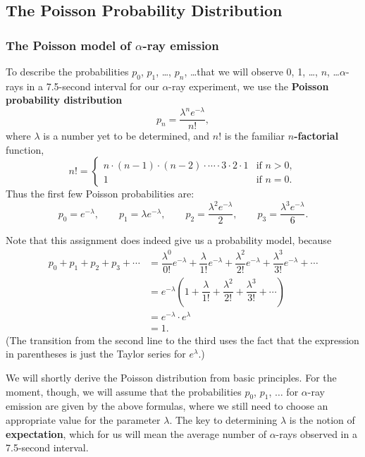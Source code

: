 \subsection{The Poisson Probability Distribution}
\label{subsec:the-poisson-probability-distribution}


\subsubsection{The Poisson model of $\alpha$-ray emission}
\label{subsubsec:the-poisson-model-of-alpha-ray-emission}

To describe the probabilities $p_0$, $p_1$, \ldots, $p_n$, \ldots that
we will observe 0, 1, \ldots, $n$, \ldots $\alpha$-rays in a
7.5-second interval for our $\alpha$-ray experiment, we use the {\bf
  Poisson probability distribution}
\[
p_n = \dfrac{{\lambda^n e^{-\lambda}}}{{n!}},
\] 
where $\lambda$ is a number yet to be determined, and $n!$ is the
familiar \textbf{\boldmath $n$-factorial}
function,
\[
n! = \begin{cases}
n \cdot (n-1) \cdot (n-2) \cdot \cdots \cdot 3 \cdot 2 \cdot 1 
    & \text{if $n > 0$}, \\ 
1 & \text{if $n = 0$}.
\end{cases}
\]
Thus the first few Poisson probabilities are:
\[
p_0 = e^{-\lambda}, \qquad
p_1 = \lambda e^{-\lambda}, \qquad
p_2 = \dfrac{\lambda^2e^{-\lambda}}{2}, \qquad
p_3 = \dfrac{\lambda^3e^{-\lambda}}{6}.
\]

Note that this assignment does indeed give us a probability model, because
\begin{align*}
p_0 + p_1 + p_2  +p_3 + \cdots 
  &=  \dfrac{\lambda^0}{0!}e^{-\lambda} + \dfrac{\lambda}{1!} e^{-\lambda} 
      + \dfrac{\lambda ^2}{2!}e^{-\lambda} 
      + \dfrac{\lambda ^3}{3!}e^{-\lambda} +\cdots \\
  &= e^{-\lambda}\left( 1 + \dfrac{\lambda}{1!} + \dfrac{\lambda ^2}{2!} 
       + \dfrac{\lambda ^3}{3!} + \cdots \right) \\
  &= e^{-\lambda}\cdot e^{\lambda}\\
  &=  1. 
\end{align*}
(The transition from the second line to the third uses the fact that
the expression in parentheses is just the Taylor series for
$e^{\lambda}$.)

We will shortly derive the Poisson distribution from basic principles.
For the moment, though, we will assume that the probabilities $p_0$,
$p_1$, $\ldots$ for $\alpha$-ray emission are given by the above
formulas, where we still need to choose an appropriate value for the
parameter $\lambda$.  The key to determining $\lambda$ is the notion
of {\bf expectation}, which for us will mean the
average number of $\alpha$-rays observed in a 7.5-second interval.

